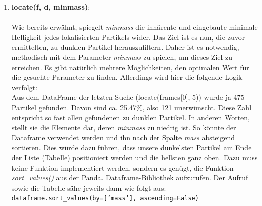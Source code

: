 \begin{enumerate}
    			
    			\item {\Large \textbf{locate(f, d, minmass)}}:\\ \\
Wie bereits erwähnt, spiegelt \textit{minmass} die inhärente und eingebaute minimale Helligkeit jedes lokalisierten Partikels wider. Das Ziel ist es nun, die zuvor ermittelten, zu dunklen Partikel herauszufiltern. Daher ist es notwendig, methodisch mit dem Parameter \textit{minmass} zu spielen, um dieses Ziel zu erreichen. Es gibt natürlich mehrere Möglichkeiten, den optimalen Wert für die gesuchte Parameter zu finden. Allerdings wird hier die folgende Logik verfolgt:\\

Aus dem DataFrame der letzten Suche (locate(frames[0], 5)) wurde ja 475 Partikel gefunden. Davon sind ca. 25.47\%, also 121 unerwünscht. Diese Zahl entspricht so fast allen gefundenen zu dunklen Partikel. In anderen Worten, stellt sie die Elemente dar, deren \textit{minmass} zu niedrig ist.
So könnte der Dataframe verwendet werden und ihn nach der Spalte \textit{mass} absteigend sortieren. 
Dies würde dazu führen, dass unsere dunkelsten Partikel am Ende der Liste (Tabelle) positioniert werden und die hellsten ganz oben. Dazu muss keine Funktion implementiert werden, sondern es genügt, die Funktion \textit{sort\_values()} aus der Panda. Dataframe-Bibliothek aufzurufen. Der Aufruf sowie die Tabelle sähe jeweils dann wie folgt aus:\\ \texttt{dataframe.sort\_values(by=['mass'], ascending=False)}


\end{enumerate}
